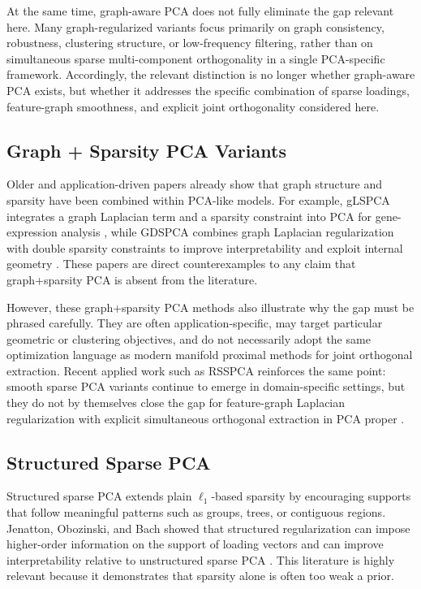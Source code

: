 \documentclass[10pt,twocolumn,letterpaper]{article}
\theoremstyle{definition}
\begin{document}
At the same time, graph-aware PCA does not fully eliminate the gap relevant here. Many graph-regularized variants focus primarily on graph consistency, robustness, clustering structure, or low-frequency filtering, rather than on simultaneous sparse multi-component orthogonality in a single PCA-specific framework. Accordingly, the relevant distinction is no longer whether graph-aware PCA exists, but whether it addresses the specific combination of sparse loadings, feature-graph smoothness, and explicit joint orthogonality considered here.

\subsection{Graph + Sparsity PCA Variants}
Older and application-driven papers already show that graph structure and sparsity have been combined within PCA-like models. For example, gLSPCA integrates a graph Laplacian term and a sparsity constraint into PCA for gene-expression analysis \cite{feng2019glspca}, while GDSPCA combines graph Laplacian regularization with double sparsity constraints to improve interpretability and exploit internal geometry \cite{wu2019gdspca}. These papers are direct counterexamples to any claim that graph+sparsity PCA is absent from the literature.

However, these graph+sparsity PCA methods also illustrate why the gap must be phrased carefully. They are often application-specific, may target particular geometric or clustering objectives, and do not necessarily adopt the same optimization language as modern manifold proximal methods for joint orthogonal extraction. Recent applied work such as RSSPCA reinforces the same point: smooth sparse PCA variants continue to emerge in domain-specific settings, but they do not by themselves close the gap for feature-graph Laplacian regularization with explicit simultaneous orthogonal extraction in PCA proper \cite{wang2025rsspca}.

\subsection{Structured Sparse PCA}
Structured sparse PCA extends plain $\ell_1$-based sparsity by encouraging supports that follow meaningful patterns such as groups, trees, or contiguous regions. Jenatton, Obozinski, and Bach showed that structured regularization can impose higher-order information on the support of loading vectors and can improve interpretability relative to unstructured sparse PCA \cite{jenatton2010sspca}. This literature is highly relevant because it demonstrates that sparsity alone is often too weak a prior.
\end{document}

